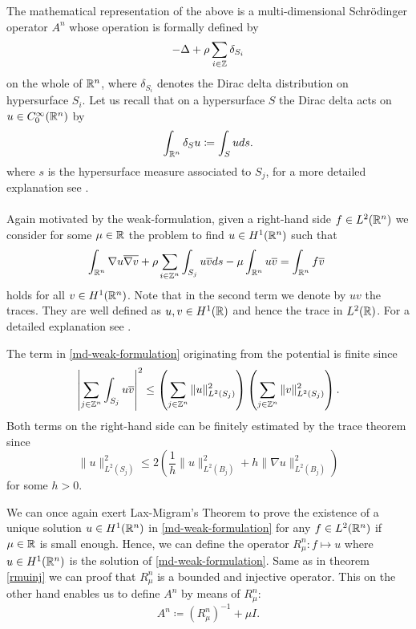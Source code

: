 The mathematical representation of the above is a multi-dimensional Schrödinger operator $A^{n}$ whose operation is formally defined by
\begin{equation}
	- \Delta + \rho \sum_{i \in \mathbb{Z}} \delta_{S_{i}} \label{md-the-operator-A-formally}
\end{equation}
on the whole of $\mathbb{R}^{n}$, where $\delta_{S_{i}}$ denotes the Dirac delta distribution on hypersurface $S_{i}$. Let us recall that on a hypersurface $S$ the Dirac delta acts on $u \in C_{0}^{\infty}(\mathbb{R}^{n})$ by %
	\[ \int_{\mathbb{R}^{n}} \delta_{S} u \coloneqq \int_{S} u ds . \]
where $s$ is the hypersurface measure associated to $S_{j}$, for a more detailed explanation see \cite{HeeringEP}.
~\\ ~\\ %
Again motivated by the weak-formulation, given a right-hand side $f \in L^{2}(\mathbb{R}^{n})$ we consider for some $\mu \in \mathbb{R}$ the problem to find $u \in H^{1}(\mathbb{R}^{n})$ such that
	\begin{equation}
		\int_{\R^{n}} \nabla u \overline{\nabla v} + \rho \sum_{i \in \Z^{n}} \int_{S_{j}} u \overline{v} ds - \mu \int_{\R^{n}} u \overline{v} = \int_{\R^{n}} f \overline{v} \label{md-weak-formulation}
	\end{equation} 
holds for all $v \in H^{1}(\mathbb{R}^{n})$. Note that in the second term we denote by $u v$ the traces. They are well defined as $u, v \in H^{1}(\mathbb{R})$ and hence the trace in $L^{2}(\mathbb{R})$. For a detailed explanation see \cite[page 164]{Adams}.  %

\begin{remark}
	The term in \eqref{md-weak-formulation} originating from the potential is finite since
	\[ \left| \sum_{j \in \mathbb{Z}^{n}} \int_{S_{j}} u \overline{v} \right|^{2} \leq \left( \sum_{j \in \mathbb{Z}^{n}} \| u \|_{L^{2}(S_{j})}^{2} \right) \left( \sum_{j \in \mathbb{Z}^{n}} \| v \|_{L^{2}(S_{j})}^{2} \right). \] %
	Both terms on the right-hand side can be finitely estimated by the trace theorem \cite[page 258]{Evans98} since
	\[ \| u \|_{L^{2}(S_{j})}^{2} \leq 2 \left( \frac{1}{h} \|u\|_{L^{2}(B_{j})}^{2} + h \| \nabla u \|_{L^{2}(B_{j})}^{2} \right) \]
	for some $h > 0$. %
\end{remark}

We can once again exert Lax-Migram's Theorem to prove the existence of a unique solution $u \in H^{1}(\mathbb{R}^{n})$ in \eqref{md-weak-formulation} for any $f \in L^{2}(\mathbb{R}^{n})$ if $\mu \in \mathbb{R}$ is small enough. Hence, we can define the operator $R_{\mu}^{n} \colon f \mapsto u$ where $u \in H^{1}(\mathbb{R}^{n})$ is the solution of \eqref{md-weak-formulation}. Same as in theorem \ref{rmuinj} we can proof that $R_{\mu}^{n}$ is a bounded and injective operator. This on the other hand enables us to define $A^{n}$ by means of $R_{\mu}^{n}$:
\[ A^{n} \coloneqq \left(R_{\mu}^{n}\right)^{-1} + \mu I. \]
 
